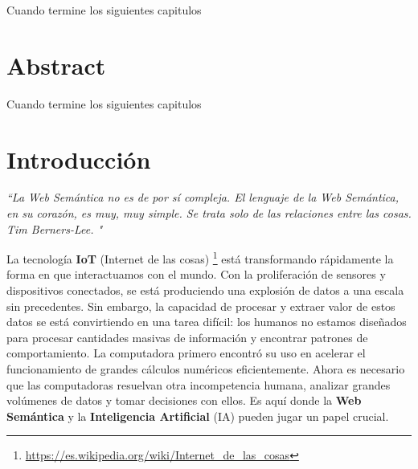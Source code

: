 \documentclass[12pt]{article}
\begin{document}
Cuando termine los siguientes capitulos





\newpage
\vspace*{3cm}
\section*{Abstract}
\vspace*{1cm}

Cuando termine los siguientes capitulos




\setcounter{section}{-1}


\newpage
\tableofcontents









\newpage



\vspace*{3cm}
\section{Introducci\'on}



\vspace*{1cm}

\textit{“La Web Semántica no es de por sí compleja. El lenguaje de la Web Semántica, en su corazón, es muy, muy simple. Se trata solo de las relaciones entre las cosas. Tim Berners-Lee.
" \citep{ref31}}

\vspace*{0.6cm}


La tecnología \textbf{IoT} (Internet de las cosas) \footnote{\href{{https://es.wikipedia.org/wiki/Internet_de_las_cosas}}{\url{https://es.wikipedia.org/wiki/Internet_de_las_cosas}}} está transformando rápidamente la forma en que interactuamos con el mundo. Con la proliferación de sensores y dispositivos conectados, se está produciendo una explosión de datos a una escala sin precedentes. Sin embargo, la capacidad de procesar y extraer valor de estos datos se está convirtiendo en una tarea difícil: los humanos no estamos diseñados para procesar cantidades masivas de información y encontrar patrones de comportamiento. La computadora primero encontró su uso en acelerar el funcionamiento de grandes cálculos numéricos eficientemente. Ahora es necesario que las computadoras resuelvan otra incompetencia humana, analizar grandes volúmenes de datos y tomar decisiones con ellos. Es aquí donde la \textbf{Web Semántica} y la \textbf{Inteligencia Artificial} (IA) pueden jugar un papel crucial.
\end{document}
